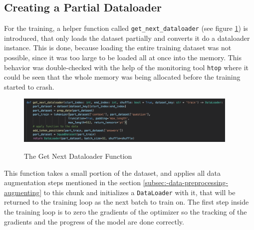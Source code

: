         \subsection{Creating a Partial Dataloader}
        \label{sec:-creating-a-partial-dataloader}
            For the training, a helper function called \texttt{get\_next\_dataloader} (see figure \ref{fig:-get-next-dataloader}) is introduced, that only loads the dataset partially and converts it do a dataloader instance. This is done, because loading the entire training dataset was not possible, since it was too large to be loaded all at once into the memory.
            This behavior was double-checked with the help of the monitoring tool \texttt{htop} where it could be seen that the whole memory was being allocated before the training started to crash.

            \begin{figure}[h!]
                \centering
                \caption{The Get Next Dataloader Function \cite[\texttt{bert\_training.ipynb}]{innerProject}}
                \includegraphics[width=0.95\textwidth]{figures/get_next_dataloader.png}
                \label{fig:-get-next-dataloader}
            \end{figure}
        This function takes a small portion of the dataset, and applies all data augmentation steps mentioned in the section \ref{subsec:-data-preprocessing-augmenting} to this chunk and initializes a \texttt{DataLoader} with it, that will be returned to the training loop as the next batch to train on.
        The first step inside the training loop is to zero the gradients of the optimizer so the tracking of the gradients and the progress of the model are done correctly.

